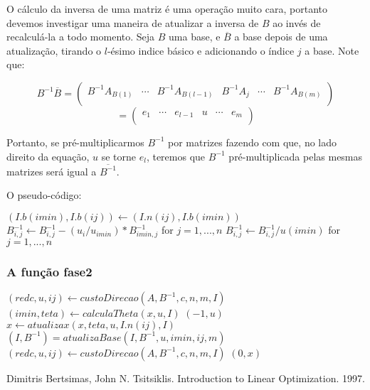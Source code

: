\documentclass[12pt]{article}
\begin{document}
O cálculo da inversa de uma matriz é uma operação muito cara, portanto devemos investigar uma maneira de atualizar a inversa de $B$ ao invés de recalculá-la a todo momento. Seja $B$ uma base, e $\overline{B}$ a base depois de uma atualização, tirando o $l$-ésimo indice básico e adicionando o índice $j$ a base. Note que:
\begin{center}
$$
B^{-1}\overline{B} =
\begin{pmatrix}
B^{-1}A_{B(1)}  & \cdots & B^{-1}A_{B(l - 1)} & B^{-1}A_j & \cdots & B^{-1}A_{B(m)} \\    
\end{pmatrix}
$$
$$
=\begin{pmatrix}
e_1  & \cdots & e_{l-1} & u & \cdots & e_m \\    
\end{pmatrix}
$$
\end{center}
Portanto, se pré-multiplicarmos $B^{-1}$ por matrizes fazendo com que, no lado direito da equação, $u$ se torne $e_l$, teremos que $B^{-1}$ pré-multiplicada pelas mesmas matrizes será igual a $\overline{B^{-1}}$.

O pseudo-código:
\begin{algorithmic}
\State $(I.b(imin), I.b(ij)) \gets (I.n(ij), I.b(imin))$
		\State $B^{-1}_{i, j} \gets B^{-1}_{i, j} - (u_i / u_{imin}) * B^{-1}_{imin, j}$ for $j = 1, ..., n$
	\EndIf
\EndFor
\State $B^{-1}_{i, j} \gets B^{-1}_{i, j} / u(imin)$ for $j = 1, ..., n$
\EndFunction
\end{algorithmic}


\subsubsection{A função fase2}
\begin{algorithmic}
	\State $(redc, u, ij) \gets custoDirecao (A, B^{-1}, c, n, m, I)$
    		\State $(imin, teta) \gets calculaTheta(x, u, I)$
    		    			\Return $(-1, u)$
    		\EndIf
    		\State $x \gets atualizax(x, teta, u, I.n(ij), I)$
    		\State $(I, B^{-1}) = atualizaBase(I, B^{-1}, u, imin, ij, m)$
    		\State $(redc, u, ij) \gets custoDirecao (A, B^{-1}, c, n, m, I)$
    \EndWhile
    \Return $(0, x)$
\EndFunction
\end{algorithmic}

\newpage


	

\newpage
\begin{thebibliography}{9}
 Dimitris Bertsimas, John N. Tsitsiklis. Introduction to Linear Optimization. 1997.
\end{thebibliography}
\end{document}
